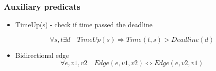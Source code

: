 \documentclass{article}                     %
\begin{document}
	\subsubsection{Auxiliary predicats }
	\begin{itemize}
		\item TimeUp(s) - check if time passed the deadline
		
\begin{equation}\label{key}
		 \forall s, t \exists d \quad TimeUp(s) \Rightarrow Time(t, s) > Deadline(d) 
\end{equation}
		
		\item Bidirectional edge
		\begin{equation}\label{key}
		 \forall e, v1, v2 \quad Edge(e, v1, v2) \Leftrightarrow Edge(e, v2, v1) 
		\end{equation}
		
	\end{itemize}
\end{document}
